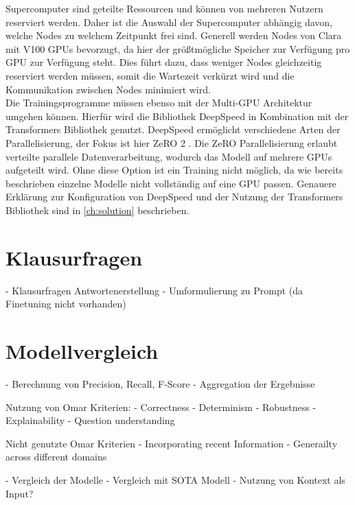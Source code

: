 Supercomputer sind geteilte Ressourcen und können von mehreren Nutzern reserviert werden.
Daher ist die Auswahl der Supercomputer abhängig davon, welche Nodes zu welchem Zeitpunkt frei sind.
Generell werden Nodes von Clara mit V100 GPUs bevorzugt, da hier der größtmögliche Speicher zur Verfügung pro GPU zur Verfügung steht.
Dies führt dazu, dass weniger Nodes gleichzeitig reserviert werden müssen, somit die Wartezeit verkürzt wird und die Kommunikation zwischen Nodes minimiert wird.\\

Die Trainingsprogramme müssen ebenso mit der Multi-GPU Architektur umgehen können.
Hierfür wird die Bibliothek DeepSpeed \citep{deepspeed} in Kombination mit der Transformers Bibliothek genutzt.
DeepSpeed ermöglicht verschiedene Arten der Parallelisierung, der Fokus ist hier ZeRO 2 \citep{ZeRO}. Die ZeRO Parallelisierung erlaubt verteilte parallele Datenverarbeitung, wodurch das Modell auf mehrere GPUs aufgeteilt wird.
Ohne diese Option ist ein Training nicht möglich, da wie bereits beschrieben einzelne Modelle nicht vollständig auf eine GPU passen.
Genauere Erklärung zur Konfiguration von DeepSpeed und der Nutzung der Transformers Bibliothek sind in \ref{ch:solution} beschrieben.

\section{Klausurfragen}
- Klausurfragen Antwortenerstellung
- Umformulierung zu Prompt (da Finetuning nicht vorhanden)

\section{Modellvergleich}
- Berechnung von Precision, Recall, F-Score
- Aggregation der Ergebnisse

Nutzung von Omar Kriterien:
    - Correctness
    - Determinism
    - Robustness
    - Explainability
    - Question understanding

Nicht genutzte Omar Kriterien
    - Incorporating recent Information
    - Generailty across different domains
    
- Vergleich der Modelle
- Vergleich mit SOTA Modell
    - Nutzung von Kontext als Input?


